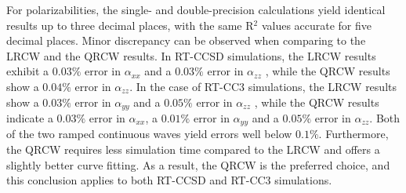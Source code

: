 For polarizabilities, the single- and double-precision calculations yield identical results up to three decimal places, with the same R$^{2}$ values accurate for five decimal places. Minor discrepancy can be observed when comparing to the LRCW  and the QRCW results. In RT-CCSD simulations, the LRCW results exhibit a $0.03\%$ error in $\alpha_{xx}$ and a $0.03\%$ error in $\alpha_{zz}$ , while the QRCW results show a $0.04\%$ error in $\alpha_{zz}$. In the case of RT-CC3 simulations, the LRCW results show a $0.03\%$ error in $\alpha_{yy}$ and a $0.05\%$ error in $\alpha_{zz}$ , while the QRCW results indicate a $0.03\%$ error in $\alpha_{xx}$, a $0.01\%$ error in $\alpha_{yy}$ and a $0.05\%$ error in $\alpha_{zz}$. Both of the two ramped continuous waves yield errors well below $0.1\%$. Furthermore, the QRCW requires less simulation time compared to the LRCW and offers a slightly better curve fitting. As a result, the QRCW is the preferred choice, and this conclusion applies to both RT-CCSD and RT-CC3 simulations.
